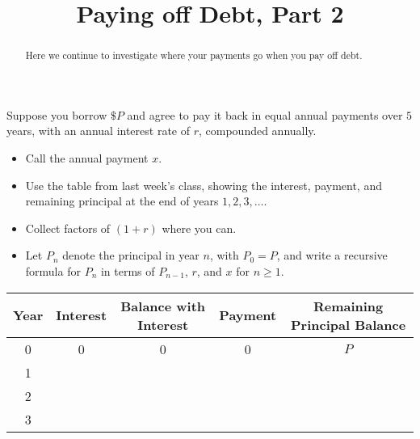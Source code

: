 \documentclass[handout,space,nooutcomes]{ximera}
\title{Paying off Debt, Part 2}
\begin{document}
\begin{abstract}
Here we continue to investigate where your payments go when you pay off debt.
\end{abstract}
\maketitle

\begin{question}[1in]
Suppose you borrow $\$P$ and agree to pay it back in equal annual
payments over $5$ years, with an annual interest rate of $r$, compounded annually.  

\begin{itemize}
\item Call the annual payment $x$.
\item Use the table from last week's class, showing the interest, payment, and remaining
principal at the end of years $1, 2, 3, \dots$.  
\item Collect factors of $(1+r)$ where you can.  
\item Let $P_n$ denote the principal in year $n$, with $P_0=P$, and write a recursive formula for $P_n$ in terms of $P_{n-1}$, $r$, and $x$ for $n\ge 1$.  
\end{itemize}




\def\arraystretch{2}
\begin{table}[h]
\begin{tabular}{|c|c|c|c|c|}
\hline
Year & Interest & Balance with Interest & Payment & Remaining Principal Balance \\ \hline
0    &   0     &       0            &   0    &  $P$                 \\ \hline
1    &          &                     &         &                             \\ \hline
2    &          &                     &         &                             \\ \hline
3    &          &                     &         &                             \\ \hline
\end{tabular}
\end{table}


\begin{freeResponse}
\end{freeResponse}
\end{question}
\end{document}

